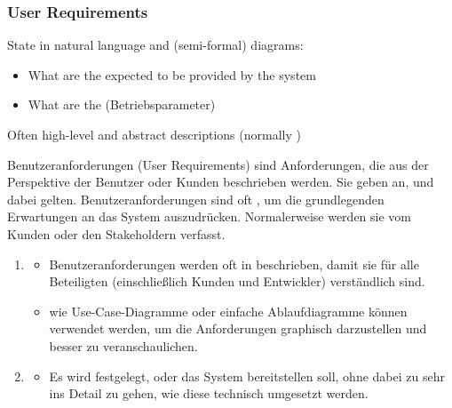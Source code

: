 \subsubsection{User Requirements}
\begin{defBox}[title=User Requirements]
	State in natural language and (semi-formal) diagrams:
	\begin{itemize}
		\item What are the  expected to be provided by the system
		\item What are the  (Betriebsparameter)
	\end{itemize}
	Often high-level and abstract descriptions (normally )
\end{defBox}
\begin{infoBox}
    Benutzeranforderungen (User Requirements) sind Anforderungen, die aus der Perspektive der Benutzer oder Kunden beschrieben werden. Sie geben an,  und  dabei gelten. Benutzeranforderungen sind oft , um die grundlegenden Erwartungen an das System auszudrücken. Normalerweise werden sie vom Kunden oder den Stakeholdern verfasst.\\
    \begin{enumerate}
        \item {}
        \begin{itemize}
            \item Benutzeranforderungen werden oft in  beschrieben, damit sie für alle Beteiligten (einschließlich Kunden und Entwickler) verständlich sind.
            \item {} wie Use-Case-Diagramme oder einfache Ablaufdiagramme können verwendet werden, um die Anforderungen graphisch darzustellen und besser zu veranschaulichen.
        \end{itemize}
        \item {}
        \begin{itemize}
            \item Es wird festgelegt,  oder  das System bereitstellen soll, ohne dabei zu sehr ins Detail zu gehen, wie diese technisch umgesetzt werden.

\end{itemize}
\end{enumerate}
\end{infoBox}
